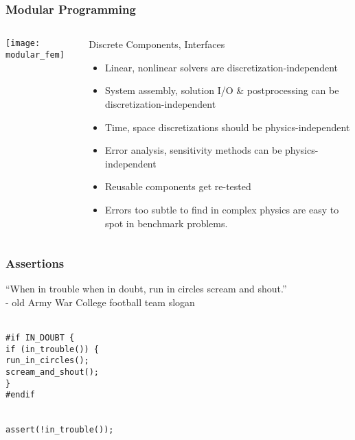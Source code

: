 \begin{frame}
\frametitle{Modular Programming}
\begin{columns}
\begin{column}{.35\textwidth}
\begin{center}
\texttt{[image: modular\_fem]}
\end{center}
\end{column}
\begin{column}{.65\textwidth}
\begin{block}{Discrete Components, Interfaces}
\begin{itemize}
\item Linear, nonlinear solvers are discretization-independent
\item System assembly, solution I/O \& postprocessing can be
discretization-independent
\item Time, space discretizations should be physics-independent
\item Error analysis, sensitivity methods can be
physics-independent
\end{itemize}
\end{block}

\begin{itemize}
\item Reusable components get re-tested

\item Errors too subtle to find in complex physics are easy to spot
in benchmark problems.
\end{itemize}
\end{column}
\end{columns}

\end{frame}


\begin{frame}
\frametitle{Assertions}

\vfill

``When in trouble when in doubt, run in circles scream and shout.''\\
- old Army War College football team slogan

\pause
\vfill

{\texttt{
\\
\#if IN\_DOUBT \{ \\
\quad if (in\_trouble()) \{ \\
\quad\quad  run\_in\_circles(); \\
\quad\quad  scream\_and\_shout(); \\
\quad \} \\
\#endif
}}

\pause
\vfill

{\texttt{
\\
assert(!in\_trouble());
}}

\vfill

\end{frame}

